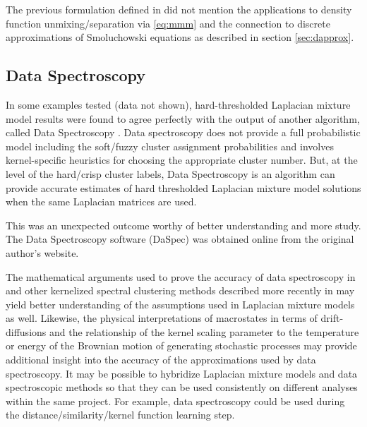 \documentclass[10pt,letterpaper]{article}
\begin{document}
The previous formulation defined in \cite{korenblum} did not mention the applications to density function unmixing/separation via \eqref{eq:mmm} and the connection to discrete approximations of Smoluchowski equations as described in section \ref{sec:dapprox}.
\subsection*{Data Spectroscopy}
In some examples tested (data not shown), hard-thresholded Laplacian mixture model results were found to agree perfectly with the output of another algorithm, called Data Spectroscopy \cite{shi09}.
Data spectroscopy does not provide a full probabilistic model including the soft/fuzzy cluster assignment probabilities and involves kernel-specific heuristics for choosing the appropriate cluster number.
But, at the level of the hard/crisp cluster labels, Data Spectroscopy is an algorithm can provide accurate estimates of hard thresholded Laplacian mixture model solutions when the same Laplacian matrices are used.

This was an unexpected outcome worthy of better understanding and more study.
The Data Spectroscopy software (DaSpec) was obtained online from the original author's website.

The mathematical arguments used to prove the accuracy of data spectroscopy in \cite{shi09} and other kernelized spectral clustering methods described more recently in \cite{schi15} may yield better understanding of the assumptions used in Laplacian mixture models as well.
Likewise, the physical interpretations of macrostates in terms of drift-diffusions and the relationship of the kernel scaling parameter to the temperature or energy of the Brownian motion of generating stochastic processes may provide additional insight into the accuracy of the approximations used by data spectroscopy.
It may be possible to hybridize Laplacian mixture models and data spectroscopic methods so that they can be used consistently on different analyses within the same project.
For example, data spectroscopy could be used during the distance/similarity/kernel function learning step.
\end{document}
